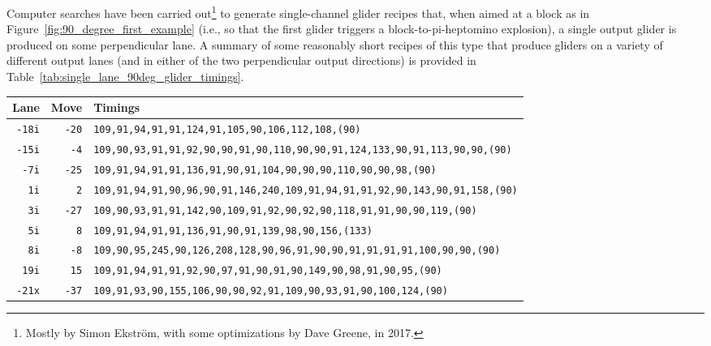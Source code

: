 Computer searches have been carried out\footnote{Mostly by Simon Ekstr{\"o}m, with some optimizations by Dave Greene, in 2017.} to generate single-channel glider recipes that, when aimed at a block as in Figure~\ref{fig:90_degree_first_example} (i.e., so that the first glider triggers a block-to-pi-heptomino explosion), a single output glider is produced on some perpendicular lane. A summary of some reasonably short recipes of this type that produce gliders on a variety of different output lanes (and in either of the two perpendicular output directions) is provided in Table~\ref{tab:single_lane_90deg_glider_timings}.

\begin{table}[!htb]
	\centering
	\begin{tabular}{@{\hskip 0.31cm}L@{\hskip 0.27cm}r@{\hskip 0.27cm}R@{\hskip 0.34cm}}\toprule
		Lane & Move & Timings \\\midrule
		\texttt{-18i} & \texttt{-20} & \footnotesize\texttt{109,91,94,91,91,124,91,105,90,106,112,108,{\color{gray}(90)}}\\
		\texttt{-15i} & \texttt{-4} & \footnotesize\texttt{109,90,93,91,91,92,90,90,91,90,110,90,90,91,124,133,90,91,113,90,90,{\color{gray}(90)}}\\
		\texttt{-7i} & \texttt{-25} & \footnotesize\texttt{109,91,94,91,91,136,91,90,91,104,90,90,90,110,90,90,98,{\color{gray}(90)}}\\
		\texttt{1i} & \texttt{2} & \footnotesize\texttt{109,91,94,91,90,96,90,91,146,240,109,91,94,91,91,92,90,143,90,91,158,{\color{gray}(90)}}\\
		\texttt{3i} & \texttt{-27} & \footnotesize\texttt{109,90,93,91,91,142,90,109,91,92,90,92,90,118,91,91,90,90,119,{\color{gray}(90)}}\\
		\texttt{5i} & \texttt{8} & \footnotesize\texttt{109,91,94,91,91,136,91,90,91,139,98,90,156,{\color{gray}(133)}}\\
		\texttt{8i} & \texttt{-8} & \footnotesize\texttt{109,90,95,245,90,126,208,128,90,96,91,90,90,91,91,91,91,100,90,90,{\color{gray}(90)}}\\
		\texttt{19i} & \texttt{15} & \footnotesize\texttt{109,91,94,91,91,92,90,97,91,90,91,90,149,90,98,91,90,95,{\color{gray}(90)}}\\\midrule
		\texttt{-21x} & \texttt{-37} & \footnotesize\texttt{109,91,93,90,155,106,90,90,92,91,109,90,93,91,90,100,124,{\color{gray}(90)}}\\

\end{tabular}
\end{table}
